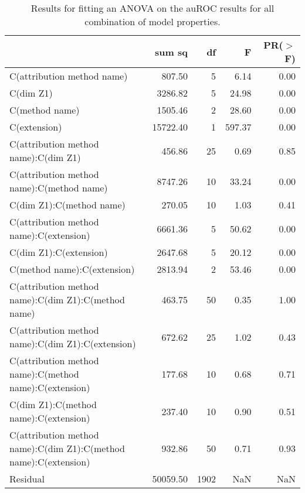 \begin{table*}[ht]
\centering
\caption{Results for fitting an ANOVA on the auROC results for all combination of model properties.}
\label{tbl:anova}
\footnotesize
\centering
\begin{tabular}{lrrrr}
\toprule
 & sum sq & df & F & PR($>$F) \\
\midrule
C(attribution method name) & 807.50 & 5 & 6.14 & 0.00 \\
C(dim Z1) & 3286.82 & 5 & 24.98 & 0.00 \\
C(method name) & 1505.46 & 2 & 28.60 & 0.00 \\
C(extension) & 15722.40 & 1 & 597.37 & 0.00 \\
C(attribution method name):C(dim Z1) & 456.86 & 25 & 0.69 & 0.85 \\
C(attribution method name):C(method name) & 8747.26 & 10 & 33.24 & 0.00 \\
C(dim Z1):C(method name) & 270.05 & 10 & 1.03 & 0.41 \\
C(attribution method name):C(extension) & 6661.36 & 5 & 50.62 & 0.00 \\
C(dim Z1):C(extension) & 2647.68 & 5 & 20.12 & 0.00 \\
C(method name):C(extension) & 2813.94 & 2 & 53.46 & 0.00 \\
C(attribution method name):C(dim Z1):C(method name) & 463.75 & 50 & 0.35 & 1.00 \\
C(attribution method name):C(dim Z1):C(extension) & 672.62 & 25 & 1.02 & 0.43 \\
C(attribution method name):C(method name):C(extension) & 177.68 & 10 & 0.68 & 0.71 \\
C(dim Z1):C(method name):C(extension) & 237.40 & 10 & 0.90 & 0.51 \\
C(attribution method name):C(dim Z1):C(method name):C(extension) & 932.86 & 50 & 0.71 & 0.93 \\
Residual & 50059.50 & 1902 & NaN & NaN \\
\bottomrule
\end{tabular}
\end{table*}



